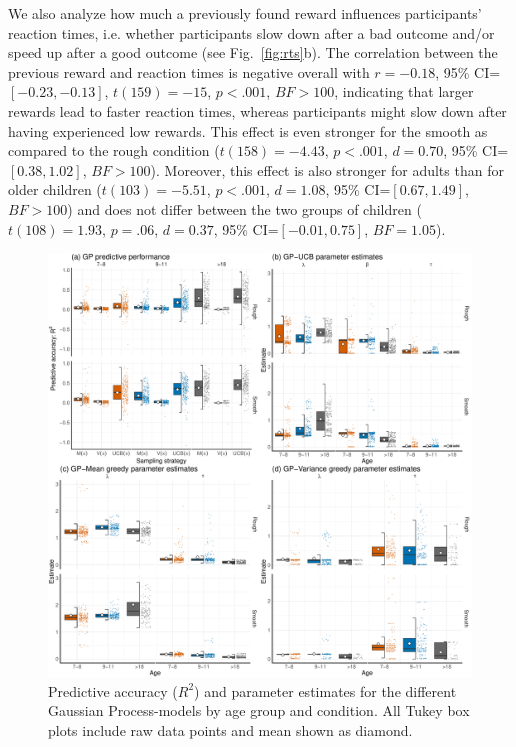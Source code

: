 We also analyze how much a previously found reward influences participants' reaction times, i.e. whether participants slow down after a bad outcome and/or speed up after a good outcome (see Fig.~\ref{fig:rts}b). The correlation between the previous reward and reaction times is negative overall with $r=-0.18$, 95\% CI=$[-0.23, -0.13]$, $t(159)=-15$, $p<.001$, $BF>100$, indicating that larger rewards lead to faster reaction times, whereas participants might slow down after having experienced low rewards. This effect is even stronger for the smooth as compared to the rough condition ($t(158)=-4.43$, $p<.001$, $d=0.70$, 95\% CI=$[0.38, 1.02]$, $BF>100$). Moreover, this effect is also stronger for adults than for older children ($t(103)=-5.51$, $p<.001$, $d=1.08$, 95\% CI=$[0.67, 1.49]$, $BF>100$) and does not differ between the two groups of children ($t(108)=1.93$, $p=.06$, $d=0.37$, 95\% CI=$[-0.01, 0.75]$, $BF=1.05$). 

\begin{figure}[ht!]
\centering
\includegraphics[width=0.9\linewidth]{fullgp.pdf}
\caption{Predictive accuracy ($R^2$) and parameter estimates for the different Gaussian Process-models by age group and condition. All Tukey box plots include raw data points and mean shown as diamond.} 
\label{fig:gpfull}
\vspace{-1mm}
\end{figure}

